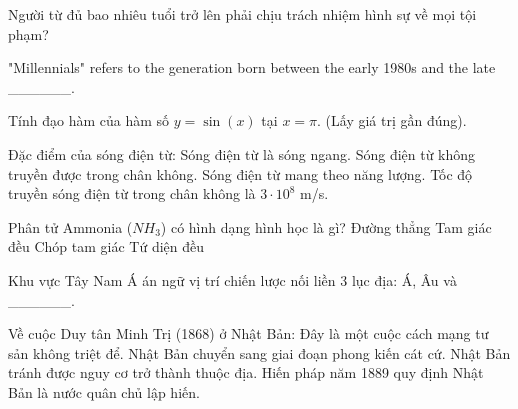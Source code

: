\begin{ex}
    Người từ đủ bao nhiêu tuổi trở lên phải chịu trách nhiệm hình sự về mọi tội phạm?
\end{ex}

\begin{ex}
    "Millennials" refers to the generation born between the early 1980s and the late ______.
\end{ex}

\begin{ex}
    Tính đạo hàm của hàm số $y = \sin(x)$ tại $x = \pi$. (Lấy giá trị gần đúng).
\end{ex}

\begin{ex}
    Đặc điểm của sóng điện từ:
    \choiceTF
    {\True Sóng điện từ là sóng ngang.}
    {Sóng điện từ không truyền được trong chân không.}
    {\True Sóng điện từ mang theo năng lượng.}
    {\True Tốc độ truyền sóng điện từ trong chân không là $3 \cdot 10^8$ m/s.}
\end{ex}

\begin{ex}
    Phân tử Ammonia ($NH_3$) có hình dạng hình học là gì?
    \choice
    {Đường thẳng}
    {Tam giác đều}
    {\True Chóp tam giác}
    {Tứ diện đều}
\end{ex}

\begin{ex}
    Khu vực Tây Nam Á án ngữ vị trí chiến lược nối liền 3 lục địa: Á, Âu và ______.
\end{ex}

\begin{ex}
    Về cuộc Duy tân Minh Trị (1868) ở Nhật Bản:
    \choiceTF
    {\True Đây là một cuộc cách mạng tư sản không triệt để.}
    {Nhật Bản chuyển sang giai đoạn phong kiến cát cứ.}
    {\True Nhật Bản tránh được nguy cơ trở thành thuộc địa.}
    {\True Hiến pháp năm 1889 quy định Nhật Bản là nước quân chủ lập hiến.}
\end{ex}

